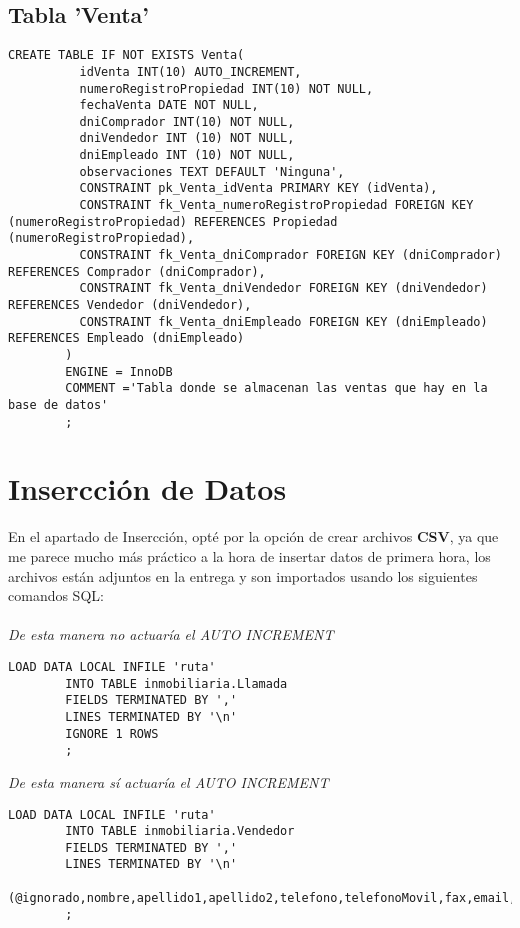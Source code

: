 \documentclass{article}
\begin{document}
      \subsection{Tabla 'Venta'}
      \begin{lstlisting}[style=C]
        CREATE TABLE IF NOT EXISTS Venta(
          idVenta INT(10) AUTO_INCREMENT,
          numeroRegistroPropiedad INT(10) NOT NULL,
          fechaVenta DATE NOT NULL,
          dniComprador INT(10) NOT NULL,
          dniVendedor INT (10) NOT NULL,
          dniEmpleado INT (10) NOT NULL,
          observaciones TEXT DEFAULT 'Ninguna',
          CONSTRAINT pk_Venta_idVenta PRIMARY KEY (idVenta),
          CONSTRAINT fk_Venta_numeroRegistroPropiedad FOREIGN KEY (numeroRegistroPropiedad) REFERENCES Propiedad (numeroRegistroPropiedad),
          CONSTRAINT fk_Venta_dniComprador FOREIGN KEY (dniComprador) REFERENCES Comprador (dniComprador),
          CONSTRAINT fk_Venta_dniVendedor FOREIGN KEY (dniVendedor) REFERENCES Vendedor (dniVendedor),
          CONSTRAINT fk_Venta_dniEmpleado FOREIGN KEY (dniEmpleado) REFERENCES Empleado (dniEmpleado)
        )
        ENGINE = InnoDB
        COMMENT ='Tabla donde se almacenan las ventas que hay en la base de datos'
        ;
      \end{lstlisting}
  \newpage
    \section{Insercción de Datos}
      En el apartado de Insercción, opté por la opción de crear archivos \textbf{CSV}, ya que me parece mucho más práctico a la hora de 
      insertar datos de primera hora, los archivos están adjuntos en la entrega y son importados usando los siguientes comandos SQL:
      \\
      \\
      \textit{De esta manera no actuaría el AUTO INCREMENT}
      \begin{lstlisting}[style=C]
        LOAD DATA LOCAL INFILE 'ruta'
        INTO TABLE inmobiliaria.Llamada
        FIELDS TERMINATED BY ','
        LINES TERMINATED BY '\n'
        IGNORE 1 ROWS
        ;
      \end{lstlisting}
      \textit{De esta manera sí actuaría el AUTO INCREMENT}
      \begin{lstlisting}[style=C]
        LOAD DATA LOCAL INFILE 'ruta'
        INTO TABLE inmobiliaria.Vendedor
        FIELDS TERMINATED BY ','
        LINES TERMINATED BY '\n'
        (@ignorado,nombre,apellido1,apellido2,telefono,telefonoMovil,fax,email,direccion,ciudad,cp,pais)
        ;
      \end{lstlisting}
\end{document}
